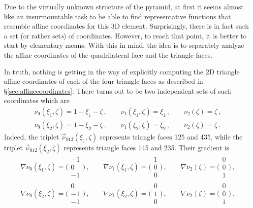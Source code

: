 Due to the virtually unknown structure of the pyramid, at first it seems almost like an insurmountable task to be able to find representative functions that resemble affine coordinates for this 3D element. 
Surprisingly, there is in fact such a set (or rather set\textit{s}) of coordinates.
However, to reach that point, it is better to start by elementary means.
With this in mind, the idea is to separately analyze the affine coordinates of the quadrilateral face and the triangle faces.

In truth, nothing is getting in the way of explicitly computing the 2D triangle affine coordinates of each of the four triangle faces as described in \S\ref{sec:affinecoordinates}.
There turns out to be two independent sets of such coordinates which are
\begin{equation}
	\begin{gathered}
		\nu_0(\xi_1,\zeta)=1-\xi_1-\zeta\,,\qquad\nu_1(\xi_1,\zeta)=\xi_1\,,\qquad\nu_2(\zeta)=\zeta\,,\\
		\nu_0(\xi_2,\zeta)=1-\xi_2-\zeta\,,\qquad\nu_1(\xi_2,\zeta)=\xi_2\,,\qquad\nu_2(\zeta)=\zeta\,.
	\end{gathered}
	\label{eq:PyramidTriCoord}
\end{equation}
Indeed, the triplet $\vec{\nu}_{012}(\xi_1,\zeta)$ represents triangle faces 125 and 435, while the triplet $\vec{\nu}_{012}(\xi_2,\zeta)$ represents triangle faces 145 and 235.
Their gradient is
\begin{equation}
	\begin{gathered}
		\nabla\nu_0(\xi_1,\zeta)=\bigg(\begin{smallmatrix}-1\\[2pt]0\\[2pt]-1\end{smallmatrix}\bigg)\,,\qquad
			\nabla\nu_1(\xi_1,\zeta)=\bigg(\begin{smallmatrix}1\\[2pt]0\\[2pt]0\end{smallmatrix}\bigg)\,,\qquad
				\nabla\nu_2(\zeta)=\bigg(\begin{smallmatrix}0\\[2pt]0\\[2pt]1\end{smallmatrix}\bigg)\,,\\
		\nabla\nu_0(\xi_2,\zeta)=\bigg(\begin{smallmatrix}0\\[2pt]-1\\[2pt]-1\end{smallmatrix}\bigg)\,,\qquad
			\nabla\nu_1(\xi_2,\zeta)=\bigg(\begin{smallmatrix}0\\[2pt]1\\[2pt]0\end{smallmatrix}\bigg)\,,\qquad
				\nabla\nu_2(\zeta)=\bigg(\begin{smallmatrix}0\\[2pt]0\\[2pt]1\end{smallmatrix}\bigg)\,.
	\end{gathered}
	\label{eq:PyramidTriCoordGrad}
\end{equation}

